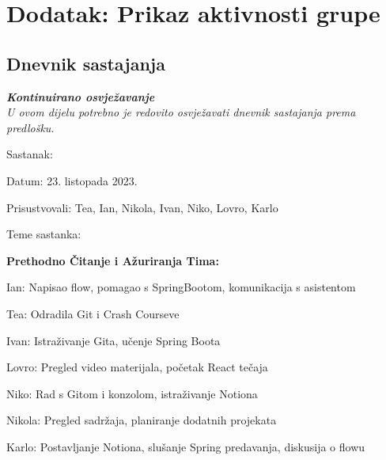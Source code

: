 \chapter*{Dodatak: Prikaz aktivnosti grupe}
		
		\section*{Dnevnik sastajanja}
		
		\textbf{\textit{Kontinuirano osvježavanje}}\\
		
		 \textit{U ovom dijelu potrebno je redovito osvježavati dnevnik sastajanja prema predlošku.}
		
		\begin{packed_enum}
        \item Sastanak: 
            \item[] \begin{packed_item}
                \item Datum: 23. listopada 2023.
                \item Prisustvovali: Tea, Ian, Nikola, Ivan, Niko, Lovro, Karlo
                \item Teme sastanka:
                    \begin{packed_item}
                        \item \textbf{Prethodno Čitanje i Ažuriranja Tima:}
                            \begin{packed_item}
                                \item Ian: Napisao flow, pomagao s SpringBootom, komunikacija s asistentom
                                \item Tea: Odradila Git i Crash Courseve
                                \item Ivan: Istraživanje Gita, učenje Spring Boota
                                \item Lovro: Pregled video materijala, početak React tečaja
                                \item Niko: Rad s Gitom i konzolom, istraživanje Notiona
                                \item Nikola: Pregled sadržaja, planiranje dodatnih projekata
                                \item Karlo: Postavljanje Notiona, slušanje Spring predavanja, diskusija o flowu
                            \end{packed_item}

\end{packed_item}
\end{packed_item}
\end{packed_enum}
